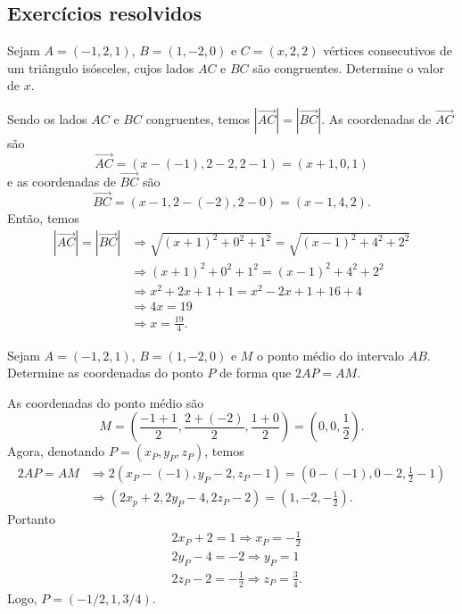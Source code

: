 \subsection*{Exercícios resolvidos}

\begin{exeresol}
  Sejam $A = (-1,2,1)$, $B = (1,-2,0)$ e $C = (x,2,2)$ vértices consecutivos de um triângulo isósceles, cujos lados $AC$ e $BC$ são congruentes. Determine o valor de $x$.
\end{exeresol}
\begin{resol}
  Sendo os lados $AC$ e $BC$ congruentes, temos $|\overrightarrow{AC}| = |\overrightarrow{BC}|$. As coordenadas de $\overrightarrow{AC}$ são
  \begin{equation}
    \overrightarrow{AC} = (x-(-1),2-2,2-1) = (x+1,0,1)
  \end{equation}
  e as coordenadas de $\overrightarrow{BC}$ são
  \begin{equation}
    \overrightarrow{BC} = (x-1,2-(-2),2-0) = (x-1,4,2).
  \end{equation}
  Então, temos
  \begin{align}
    |\overrightarrow{AC}| = |\overrightarrow{BC}| &\Rightarrow \sqrt{(x+1)^2+0^2+1^2} = \sqrt{(x-1)^2+4^2+2^2}\\
                                                  &\Rightarrow (x+1)^2+0^2+1^2 = (x-1)^2+4^2+2^2\\
                                                  &\Rightarrow x^2+2x+1+1 = x^2-2x+1+16+4\\
                                                  &\Rightarrow 4x = 19\\
                                                  &\Rightarrow x = \frac{19}{4}.
  \end{align}
\end{resol}

\begin{exeresol}
  Sejam $A = (-1,2,1)$, $B = (1,-2,0)$  e $M$ o ponto médio do intervalo $AB$. Determine as coordenadas do ponto $P$ de forma que $2AP = AM$.
\end{exeresol}
\begin{resol}
  As coordenadas do ponto médio são
  \begin{equation}
    M = \left(\frac{-1+1}{2},\frac{2+(-2)}{2},\frac{1+0}{2}\right) = \left(0,0,\frac{1}{2}\right).
  \end{equation}
  Agora, denotando $P = (x_P,y_P,z_P)$, temos
  \begin{align}
    2AP = AM &\Rightarrow 2(x_P-(-1),y_P-2,z_P-1) = \left(0-(-1),0-2,\frac{1}{2}-1\right)\\
             &\Rightarrow (2x_p+2,2y_P-4,2z_P-2) = \left(1,-2,-\frac{1}{2}\right).
  \end{align}
  Portanto
  \begin{align}
    & 2x_P+2 = 1 \Rightarrow x_P = -\frac{1}{2}\\
    & 2y_P-4 = -2 \Rightarrow y_P = 1\\
    & 2z_P-2 = -\frac{1}{2} \Rightarrow z_P = \frac{3}{4}.
  \end{align}
  Logo, $P = (-1/2,1,3/4)$.
\end{resol}

